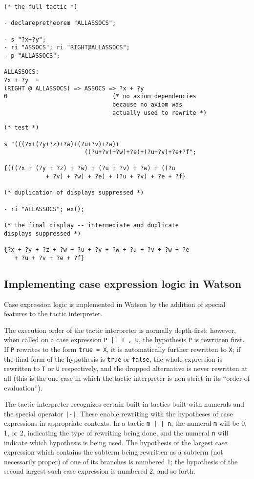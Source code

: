 \documentclass{kluwer}
\begin{document}
\begin{article}
\begin{verbatim}
(* the full tactic *)

- declarepretheorem "ALLASSOCS";

- s "?x+?y";
- ri "ASSOCS"; ri "RIGHT@ALLASSOCS";
- p "ALLASSOCS";

ALLASSOCS:  
?x + ?y  =  
(RIGHT @ ALLASSOCS) => ASSOCS => ?x + ?y
0                              (* no axiom dependencies 
                               because no axiom was 
                               actually used to rewrite *)
\end{verbatim}

\newpage

\begin{verbatim}
(* test *)

s "(((?x+(?y+?z)+?w)+(?u+?v)+?w)+
                       ((?u+?v)+?w)+?e)+(?u+?v)+?e+?f";

{(((?x + (?y + ?z) + ?w) + (?u + ?v) + ?w) + ((?u 
            + ?v) + ?w) + ?e) + (?u + ?v) + ?e + ?f} 

(* duplication of displays suppressed *)

- ri "ALLASSOCS"; ex();

(* the final display -- intermediate and duplicate
displays suppressed *)

{?x + ?y + ?z + ?w + ?u + ?v + ?w + ?u + ?v + ?w + ?e 
   + ?u + ?v + ?e + ?f}
\end{verbatim}

\subsection{Implementing case expression logic in Watson}

Case expression logic is implemented in Watson by the addition of 
special features to the tactic interpreter.

The execution order of the tactic interpreter is normally depth-first;
however, when called on a case expression {\tt P || T , U}, the
hypothesis {\tt P} is rewritten first.  If {\tt P} rewrites to the
form {\tt true = X}, it is automatically further rewritten to {\tt X};
if the final form of the hypothesis is {\tt true} or {\tt false}, the
whole expression is rewritten to {\tt T} or {\tt U} respectively, and
the dropped alternative is never rewritten at all (this is the one
case in which the tactic interpreter is non-strict in its ``order of
evaluation'').

The tactic interpreter recognizes certain built-in tactics built with
numerals and the special operator {\tt |-|}.  These enable rewriting
with the hypotheses of case expressions in appropriate contexts.  In a
tactic {\tt m |-| n}, the numeral {\tt m} will be 0, 1, or 2,
indicating the type of rewriting being done, and the numeral {\tt n}
will indicate which hypothesis is being used.  The hypothesis of the
largest case expression which contains the subterm being rewritten as
a subterm (not necessarily proper) of one of its branches is numbered
1; the hypothesis of the second largest such case expression is
numbered 2, and so forth.


\end{article}
\end{document}
